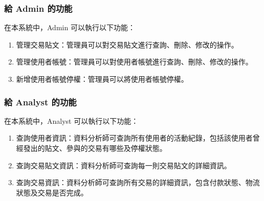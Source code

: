 \documentclass[12pt,a4paper]{article}
\begin{document}
   

   
   
\subsubsection{給 Admin 的功能}

在本系統中，Admin 可以執行以下功能：
\begin{enumerate}
\item 

管理交易貼文：管理員可以對交易貼文進行查詢、刪除、修改的操作。

\item 

管理使用者帳號：管理員可以對使用者帳號進行查詢、刪除、修改的操作。

\item 

新增使用者帳號停權：管理員可以將使用者帳號停權。

\end{enumerate}





\subsubsection{給 Analyst 的功能}

在本系統中，Analyst 可以執行以下功能：
\begin{enumerate}
\item 

查詢使用者資訊：資料分析師可查詢所有使用者的活動紀錄，包括該使用者曾經發出的貼文、參與的交易有哪些及停權狀態。

\item 

查詢交易貼文資訊：資料分析師可查詢每一則交易貼文的詳細資訊。

\item 

查詢交易資訊：資料分析師可查詢所有交易的詳細資訊，包含付款狀態、物流狀態及交易是否完成。

\end{enumerate}
\end{document}
